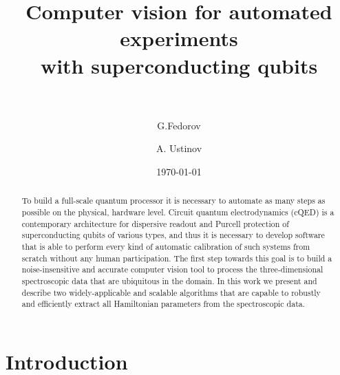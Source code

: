 \documentclass[%
 aip,
 amsmath,amssymb,
 reprint,%
]{revtex4-1}
\begin{document}

\title[Computer vision for automated experiments with superconducting qubits]{Computer vision for automated experiments\\  with superconducting qubits\\~}

\author{G.Fedorov}

%
%

\author{A. Ustinov}
%
%

\date{\today}%

\begin{abstract}
To build a full-scale quantum processor it is necessary to automate as many steps as possible on the physical, hardware level. Circuit quantum electrodynamics (cQED) is a contemporary architecture for dispersive readout and Purcell protection of superconducting qubits of various types, and thus it is necessary to develop software that is able to perform every kind of automatic calibration of such systems from scratch without any human participation. The first step towards this goal is to build a noise-insensitive and accurate computer vision tool to process the three-dimensional spectroscopic data that are ubiquitous in the domain. In this work we present and describe two widely-applicable and scalable algorithms that are capable to robustly and efficiently extract all Hamiltonian parameters from the spectroscopic data. 
\end{abstract}

\maketitle

 \renewcommand*{\figureautorefname}{Fig.}

\section{\label{sec:level1} Introduction}
\end{document}
